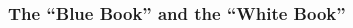 \documentclass[svgnames]{beamer}
\begin{document}
\begin{frame}
  \frametitle{The ``Blue Book'' and the ``White Book''}

  \begin{columns}
    \begin{column}{2cm}

\end{column}
\end{columns}
\end{frame}
\end{document}
